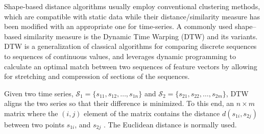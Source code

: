Shape-based distance algorithms usually employ conventional clustering methods, which are compatible with static data while their distance/similarity measure has been modified with an appropriate one for time-series. A commonly used shape--based similarity measure is the Dynamic Time Warping (DTW) \cite{Sakoe1978} and its variants. DTW is a generalization of classical algorithms for comparing discrete sequences to sequences of continuous values, and leverages dynamic programming to calculate an optimal match between two sequences of feature vectors by allowing for stretching and compression of sections of the sequences. 




Given two time series, $\mathcal{S}_{1} =\{s_{11}, s_{12}, \ldots, s_{1n}\}$ and $\mathcal{S}_{2} = \{s_{21}, s_{22}, \ldots, s_{2m}\}$, DTW aligns the two series so that their difference is minimized. To this end, an $n \times m$ matrix where the $(i, j)$ element of the matrix contains the distance $d(s_{1i}, s_{2j})$ between two points $s_{1i}$, and $s_{2j}$ . The Euclidean distance is normally used. 


